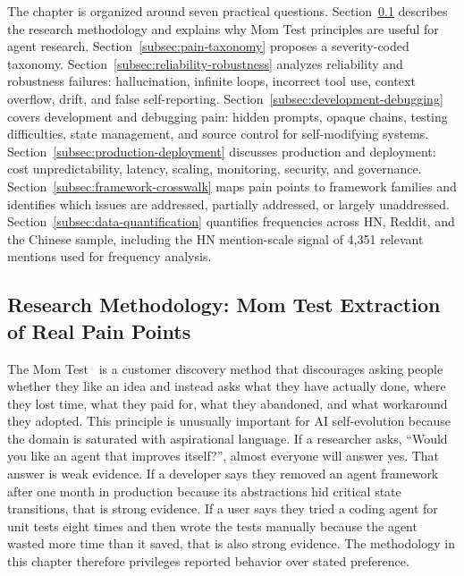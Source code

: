 The chapter is organized around seven practical questions. Section~\ref{subsec:mom-test-methodology} describes the research methodology and explains why Mom Test principles are useful for agent research. Section~\ref{subsec:pain-taxonomy} proposes a severity-coded taxonomy. Section~\ref{subsec:reliability-robustness} analyzes reliability and robustness failures: hallucination, infinite loops, incorrect tool use, context overflow, drift, and false self-reporting. Section~\ref{subsec:development-debugging} covers development and debugging pain: hidden prompts, opaque chains, testing difficulties, state management, and source control for self-modifying systems. Section~\ref{subsec:production-deployment} discusses production and deployment: cost unpredictability, latency, scaling, monitoring, security, and governance. Section~\ref{subsec:framework-crosswalk} maps pain points to framework families and identifies which issues are addressed, partially addressed, or largely unaddressed. Section~\ref{subsec:data-quantification} quantifies frequencies across HN, Reddit, and the Chinese sample, including the HN mention-scale signal of 4,351 relevant mentions used for frequency analysis.

\subsection{Research Methodology: Mom Test Extraction of Real Pain Points}
\label{subsec:mom-test-methodology}

The Mom Test~\cite{robert2013momtest} is a customer discovery method that discourages asking people whether they like an idea and instead asks what they have actually done, where they lost time, what they paid for, what they abandoned, and what workaround they adopted. This principle is unusually important for AI self-evolution because the domain is saturated with aspirational language. If a researcher asks, ``Would you like an agent that improves itself?'', almost everyone will answer yes. That answer is weak evidence. If a developer says they removed an agent framework after one month in production because its abstractions hid critical state transitions, that is strong evidence. If a user says they tried a coding agent for unit tests eight times and then wrote the tests manually because the agent wasted more time than it saved, that is also strong evidence. The methodology in this chapter therefore privileges reported behavior over stated preference.

